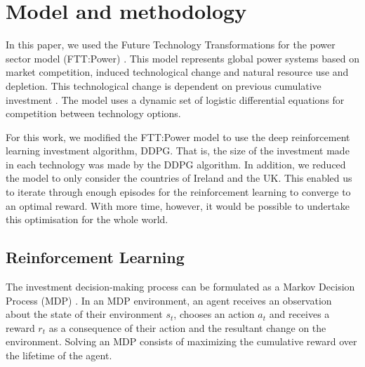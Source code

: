\documentclass{article}
\begin{document}


\section{Model and methodology}
\label{sec:methods}


In this paper, we used the Future Technology Transformations for the power sector model (FTT:Power) \cite{Mercure2012}. This model represents global power systems based on market competition, induced technological change and natural resource use and depletion. This technological change is dependent on previous cumulative investment \cite{Mercure2012}. The model uses a dynamic set of logistic differential equations for competition between technology options.

For this work, we modified the FTT:Power model to use the deep reinforcement learning investment algorithm, DDPG. That is, the size of the investment made in each technology was made by the DDPG algorithm. In addition, we reduced the model to only consider the countries of Ireland and the UK. This enabled us to iterate through enough episodes for the reinforcement learning to converge to an optimal reward. With more time, however, it would be possible to undertake this optimisation for the whole world.

\subsection*{Reinforcement Learning}

The investment decision-making process can be formulated as a Markov Decision Process (MDP) \cite{puterman2014markov}. In an MDP environment, an agent receives an observation about the state of their environment $s_t$, chooses an action $a_t$ and receives a reward $r_t$ as a consequence of their action and the resultant change on the environment. Solving an MDP consists of maximizing the cumulative reward over the lifetime of the agent. 
\end{document}
